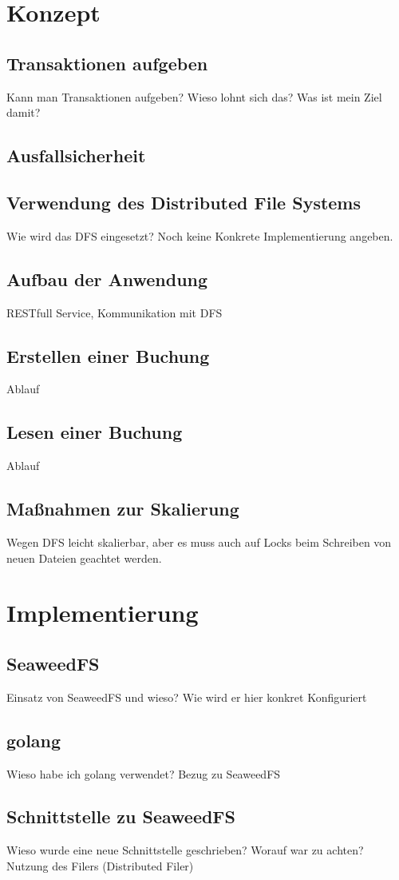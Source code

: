 \documentclass[12pt,oneside,a4paper,parskip]{scrbook}
\begin{document}
\chapter{Konzept}
\section{Transaktionen aufgeben}
Kann man Transaktionen aufgeben? Wieso lohnt sich das? Was ist mein Ziel damit?
\section{Ausfallsicherheit}
\section{Verwendung des Distributed File Systems}
Wie wird das DFS eingesetzt? Noch keine Konkrete Implementierung angeben.
\section{Aufbau der Anwendung}
RESTfull Service, Kommunikation mit DFS
\section{Erstellen einer Buchung}
Ablauf
\section{Lesen einer Buchung}
Ablauf
\section{Maßnahmen zur Skalierung}
Wegen DFS leicht skalierbar, aber es muss auch auf Locks beim Schreiben von neuen Dateien geachtet werden.


\chapter{Implementierung}
\section{SeaweedFS}
Einsatz von SeaweedFS und wieso?
Wie wird er hier konkret Konfiguriert
\section{golang}
Wieso habe ich golang verwendet? Bezug zu SeaweedFS 
\section{Schnittstelle zu SeaweedFS}
Wieso wurde eine neue Schnittstelle geschrieben?
Worauf war zu achten? Nutzung des Filers (Distributed Filer)
\end{document}
